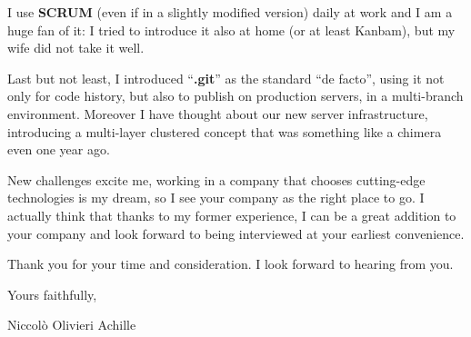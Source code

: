 \documentclass[letterpaper]{deedy-resume} %
\begin{document}
\begin{minipage}[t]{1\textwidth}
\vspace{5mm}

I use \textbf{SCRUM} (even if in a slightly modified version) daily at work and I am a huge fan of it: I tried to introduce it also at home (or at least Kanbam), but my wife did not take it well.

\vspace{5mm}

Last but not least, I introduced ``\textbf{.git}'' as the standard ``de facto'', using it not only for code history, but also to publish on production servers, in a multi-branch environment. Moreover I have thought about our new server infrastructure, introducing a multi-layer clustered concept that was something like a chimera even one year ago.

\vspace{5mm}

New challenges excite me, working in a company that chooses cutting-edge technologies is my dream, so I see your company as the right place to go. I actually think that thanks to my former experience, I can be a great addition to your company and look forward to being interviewed at your earliest convenience.

Thank you for your time and consideration. I look forward to hearing from you.

\vspace{10mm}

Yours faithfully,

\vspace{5mm}

Niccolò Olivieri Achille


\end{minipage} %




\end{document}
